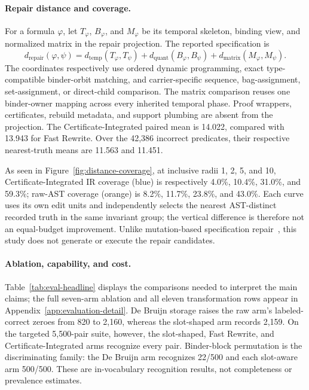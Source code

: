 \paragraph{Repair distance and coverage.}
For a formula $\varphi$, let $T_\varphi$, $B_\varphi$, and $M_\varphi$ be its
temporal skeleton, binding view, and normalized matrix in the repair
projection.  The reported specification is
\begin{equation}
  d_{\mathrm{repair}}(\varphi,\psi)=
  d_{\mathrm{temp}}(T_\varphi,T_\psi)+
  d_{\mathrm{quant}}(B_\varphi,B_\psi)+
  d_{\mathrm{matrix}}(M_\varphi,M_\psi).
\end{equation}
The coordinates respectively use ordered dynamic programming, exact
type-compatible binder-orbit matching, and carrier-specific sequence,
bag-assignment, set-assignment, or direct-child comparison.
The matrix comparison reuses one binder-owner mapping across every inherited
temporal phase. Proof wrappers,
certificates, rebuild metadata, and support plumbing are absent from the
projection.  The Certificate-Integrated paired mean is 14.022, compared with
13.943 for Fast Rewrite.  Over the 42,386 incorrect predicates, their
respective nearest-truth means are 11.563 and 11.451.

As seen in Figure~\ref{fig:distance-coverage}, at inclusive radii 1, 2, 5, and 10, Certificate-Integrated IR coverage
(blue) is respectively 4.0\%, 10.4\%, 31.0\%, and 59.3\%; raw-AST
coverage (orange) is 8.2\%, 11.7\%, 23.8\%, and 43.0\%.  Each curve uses
its own edit units and independently
selects the nearest AST-distinct recorded truth in the same invariant group;
the vertical difference is therefore not an equal-budget improvement.
Unlike mutation-based specification repair~\cite{mutrepair}, this study does not generate or execute the repair candidates. 



\paragraph{Ablation, capability, and cost.}
Table~\ref{tab:eval-headline} displays the comparisons needed to interpret the
main claims; the full seven-arm ablation and all eleven transformation rows
appear in Appendix~\ref{app:evaluation-detail}.  De Bruijn storage raises the
raw arm's labeled-correct zeroes from 820 to 2,160, whereas the slot-shaped arm
records 2,159.  On the targeted 5,500-pair suite, however, the slot-shaped,
Fast Rewrite, and Certificate-Integrated arms recognize every pair.
Binder-block permutation is the discriminating family: the De Bruijn arm
recognizes 22/500 and each slot-aware arm 500/500.  These are in-vocabulary
recognition results, not completeness or prevalence estimates.

